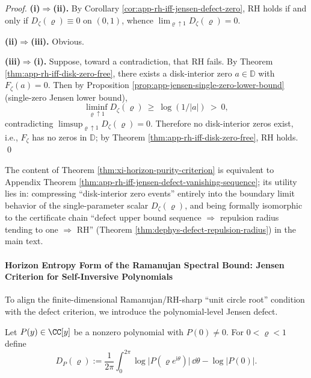 \begin{proof}
\textbf{(i)\(\Rightarrow\)(ii).}
By Corollary \ref{cor:app-rh-iff-jensen-defect-zero}, RH holds if and only if \(D_{\zeta}(\varrho)\equiv 0\) on \((0,1)\), whence \(\lim_{\varrho\uparrow 1}D_{\zeta}(\varrho)=0\).
\par
\textbf{(ii)\(\Rightarrow\)(iii).}
Obvious.
\par
\textbf{(iii)\(\Rightarrow\)(i).}
Suppose, toward a contradiction, that RH fails. By Theorem \ref{thm:app-rh-iff-disk-zero-free}, there exists a disk-interior zero \(a\in\mathbb{D}\) with \(F_{\zeta}(a)=0\).
Then by Proposition \ref{prop:app-jensen-single-zero-lower-bound} (single-zero Jensen lower bound),
\[
\liminf_{\varrho\uparrow 1}D_{\zeta}(\varrho)\ \ge\ \log(1/|a|)\ >\ 0,
\]
contradicting \(\limsup_{\varrho\uparrow 1}D_{\zeta}(\varrho)=0\).
Therefore no disk-interior zeros exist, i.e., \(F_{\zeta}\) has no zeros in \(\mathbb{D}\); by Theorem \ref{thm:app-rh-iff-disk-zero-free}, RH holds. \qed
\end{proof}

\begin{remark}\label{rem:xi-horizon-purity-audit-alignment}
The content of Theorem \ref{thm:xi-horizon-purity-criterion} is equivalent to Appendix Theorem \ref{thm:app-rh-iff-jensen-defect-vanishing-sequence}; its utility lies in: compressing ``disk-interior zero events'' entirely into the boundary limit behavior of the single-parameter scalar \(D_{\zeta}(\varrho)\), and being formally isomorphic to the certificate chain ``defect upper bound sequence \(\Rightarrow\) repulsion radius tending to one \(\Rightarrow\) RH'' (Theorem \ref{thm:dephys-defect-repulsion-radius}) in the main text.
\end{remark}

\paragraph{Horizon Entropy Form of the Ramanujan Spectral Bound: Jensen Criterion for Self-Inversive Polynomials}
To align the finite-dimensional Ramanujan/RH-sharp ``unit circle root'' condition with the defect criterion, we introduce the polynomial-level Jensen defect.

\begin{definition}\label{def:xi-poly-jensen-defect}
Let \(P(y)\in\CC[y]\) be a nonzero polynomial with \(P(0)\neq 0\).
For \(0<\varrho<1\) define
\[
D_{P}(\varrho)
:=\frac{1}{2\pi}\int_{0}^{2\pi}\log\bigl|P(\varrho e^{\mathrm{i}\theta})\bigr|\,\dd\theta-\log|P(0)|.
\]
\end{definition}

